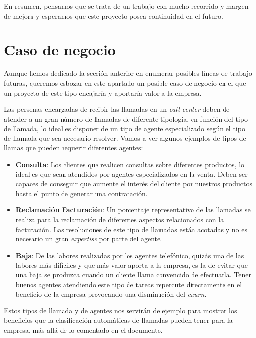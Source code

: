 En resumen, pensamos que se trata de un trabajo con mucho recorrido y margen de mejora y esperamos que este proyecto posea continuidad en el futuro.

\section{Caso de negocio}


Aunque hemos dedicado la sección anterior en enumerar posibles líneas de trabajo futuras, queremos esbozar en  este apartado un posible caso de negocio en el que un proyecto de este tipo encajaría y aportaría valor a la empresa. 

Las personas encargadas de recibir las llamadas en un \textit{call center} deben de atender a un gran número de llamadas de diferente tipología, en función del tipo de llamada, lo ideal es disponer de un tipo de agente especializado según el tipo de llamada que sea necesario resolver. Vamos a ver algunos ejemplos de tipos de llamas que pueden requerir diferentes agentes:

\begin{itemize}
\item \textbf{Consulta}:  Los clientes que realicen consultas sobre diferentes productos, lo ideal es que sean atendidos por agentes especializados en la venta. Deben ser capaces de conseguir que aumente el interés del cliente por nuestros productos hasta el punto de generar una contratación. 

\item \textbf{Reclamación Facturación}: Un porcentaje representativo de las llamadas se realiza para la reclamación de diferentes aspectos relacionados con la facturación. Las resoluciones de este tipo de llamadas están acotadas y  no es necesario un gran \textit{expertise} por parte del agente. 

\item \textbf{Baja}: De las labores realizadas por los agentes telefónico, quizás una de las labores más difíciles y que más valor aporta a la empresa, es la de evitar que una baja se produzca cuando un cliente llama convencido de efectuarla. Tener buenos agentes atendiendo este tipo de tareas repercute directamente en el beneficio de la empresa provocando una disminución del \textit{churn}.
\end{itemize}



Estos tipos de llamada y de agentes nos servirán de ejemplo para mostrar los beneficios que la clasificación automáticas de llamadas pueden tener para la empresa, más allá de lo comentado en el documento.

